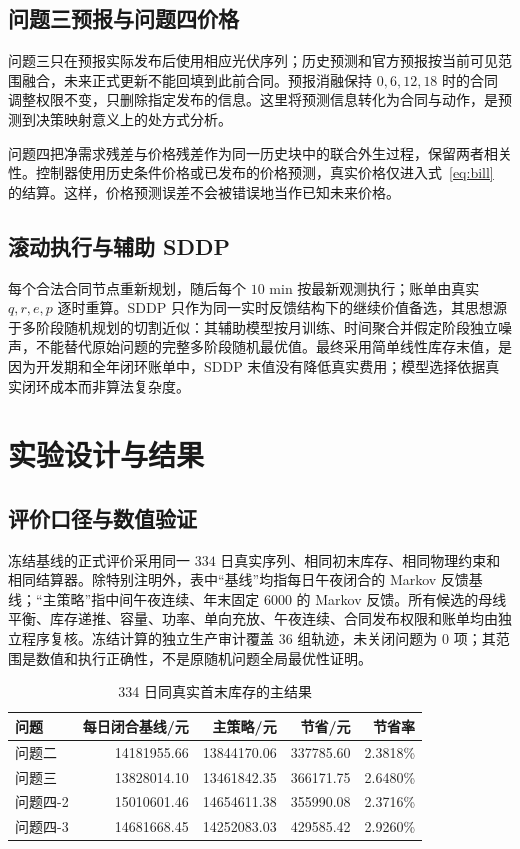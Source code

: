 \documentclass[UTF8,a4paper,zihao=-4,fontset=mac]{ctexart}
\begin{document}
\subsection{问题三预报与问题四价格}
问题三只在预报实际发布后使用相应光伏序列；历史预测和官方预报按当前可见范围融合，未来正式更新不能回填到此前合同。预报消融保持 $0,6,12,18$ 时的合同调整权限不变，只删除指定发布的信息。这里将预测信息转化为合同与动作，是预测到决策映射意义上的处方式分析\cite{prescriptive}。

问题四把净需求残差与价格残差作为同一历史块中的联合外生过程，保留两者相关性。控制器使用历史条件价格或已发布的价格预测，真实价格仅进入式~\eqref{eq:bill} 的结算。这样，价格预测误差不会被错误地当作已知未来价格。

\subsection{滚动执行与辅助 SDDP}
每个合法合同节点重新规划，随后每个 $10$ min 按最新观测执行；账单由真实 $q,r,e,p$ 逐时重算。SDDP 只作为同一实时反馈结构下的继续价值备选，其思想源于多阶段随机规划的切割近似\cite{sddp}：其辅助模型按月训练、时间聚合并假定阶段独立噪声，不能替代原始问题的完整多阶段随机最优值。最终采用简单线性库存末值，是因为开发期和全年闭环账单中，SDDP 末值没有降低真实费用；模型选择依据真实闭环成本而非算法复杂度。

\section{实验设计与结果}
\subsection{评价口径与数值验证}
冻结基线的正式评价采用同一 $334$ 日真实序列、相同初末库存、相同物理约束和相同结算器。除特别注明外，表中“基线”均指每日午夜闭合的 Markov 反馈基线；“主策略”指中间午夜连续、年末固定 $6000$ 的 Markov 反馈。所有候选的母线平衡、库存递推、容量、功率、单向充放、午夜连续、合同发布权限和账单均由独立程序复核。冻结计算的独立生产审计覆盖 $36$ 组轨迹，未关闭问题为 $0$ 项；其范围是数值和执行正确性，不是原随机问题全局最优性证明。

\begin{table}[H]\centering\small
\caption{334 日同真实首末库存的主结果}
\begin{tabular}{l r r r r}
\toprule
问题 & 每日闭合基线/元 & 主策略/元 & 节省/元 & 节省率\\\midrule
问题二 & 14181955.66 & 13844170.06 & 337785.60 & 2.3818\%\\
问题三 & 13828014.10 & 13461842.35 & 366171.75 & 2.6480\%\\
问题四-2 & 15010601.46 & 14654611.38 & 355990.08 & 2.3716\%\\
问题四-3 & 14681668.45 & 14252083.03 & 429585.42 & 2.9260\%\\
\bottomrule
\end{tabular}
\end{table}
\end{document}
